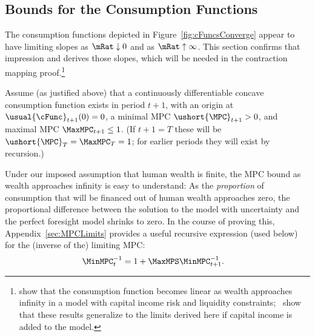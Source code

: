 \documentclass[ProjectDLO]{subfiles}
\begin{document}
\hypertarget{Bounds-for-the-Consumption-Functions}{}
\subsection{Bounds for the Consumption Functions}\label{subsec:cFuncBounds}

The consumption functions depicted in Figure~\ref{fig:cFuncsConverge} appear to have limiting slopes as $\mRat \downarrow 0$ and as $\mRat \uparrow \infty$.  This section confirms that impression and derives those slopes, which will be needed in the contraction mapping proof.\footnote{\cite{benhabibWealth} show that the consumption function becomes linear as wealth approaches infinity in a model with capital income risk and liquidity constraints;~\cite{maTodaRich} show that these results generalize to the limits derived here if capital income is added to the model.}

\newcommand{\NewMaxMinMPC}{\ushort{\MPC}}

Assume (as justified above) that a continuously differentiable concave consumption function exists in period $t+1$, with an origin at $\usual{\cFunc}_{t+1}(0)=0$, a minimal MPC $\NewMaxMinMPC_{t+1}>0$, and maximal MPC $\MaxMPC_{t+1} \leq 1$.  (If $t+1 = T$ these will be $\NewMaxMinMPC_{T}=\MaxMPC_{T}=1$; for earlier periods they will exist by recursion.)

Under our imposed assumption that human wealth is finite, the MPC bound as wealth approaches infinity is easy to understand:  As the \textit{proportion} of consumption that will be financed out of human wealth approaches zero, the proportional difference between the solution to the model with uncertainty and the perfect foresight model shrinks to zero.  \hypertarget{MPCnvrsLower}{} In the course of proving this, Appendix~\ref{sec:MPCLimits} provides a useful recursive expression (used below) for the (inverse of the) limiting MPC:\hypertarget{WRICCond}{}
\begin{align}
  \MinMPC_{t}^{-1}  & = 1+\MaxMPS \MinMPC_{t+1}^{-1} \label{eq:MinMPCInv}.
\end{align}
\end{document}
